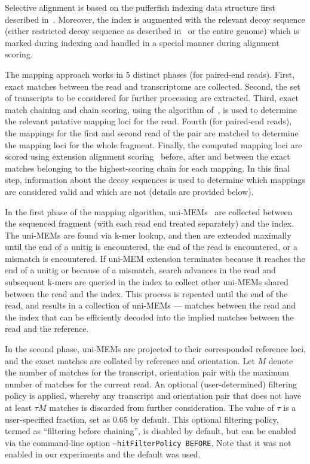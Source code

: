 Selective alignment is based on the pufferfish indexing data structure first
described in~\citep{pufferfish}. Moreover, the index is augmented with the
relevant decoy sequence (either restricted decoy sequence as described
in~ or the entire genome) which is marked during
indexing and handled in a special manner during alignment scoring.


The mapping approach works in 5 distinct phases (for paired-end reads).
First, exact matches between the read and transcriptome are collected.
Second, the set of transcripts to be considered for further processing are
extracted. Third, exact match chaining and chain scoring, using the algorithm
of~\citet{minimap2}, is used to determine the relevant putative mapping loci
for the read. Fourth (for paired-end reads), the mappings for the first and
second read of the pair are matched to determine the mapping loci for the
whole fragment. Finally, the computed mapping loci are scored using extension
alignment scoring~\citep{minimap2,suzuki2018introducing} before, after and 
between the exact matches belonging to the highest-scoring chain for each 
mapping. In this final step, information about the decoy sequences is used to
determine which mappings are considered valid and which are not (details are
provided below).

In the first phase of the mapping algorithm, uni-MEMs~\citep{debga} are
collected between the sequenced fragment (with each read end treated
separately) and the index. The uni-MEMs are found via k-mer lookup, and then
are extended maximally until the end of a unitig is encountered, the
end of the read is encountered, or a mismatch is encountered.  If uni-MEM 
extension terminates because it reaches the end of a unitig or because of a 
mismatch, search advances in the read and subsequent k-mers are queried in 
the index to collect other uni-MEMs shared between the read and the index.
This process is repeated until the end of the read, and results in a collection 
of uni-MEMs --- matches between the read and the index that can be efficiently 
decoded into the implied matches between the read and the reference.

In the second phase, uni-MEMs are projected to their corresponded reference
loci, and the exact matches are collated by reference and orientation. Let
$M$ denote the number of matches for the transcript, orientation pair with
the maximum number of matches for the current read. An optional
(user-determined) filtering policy is applied, whereby any transcript and
orientation pair that does not have at least $\tau M$ matches is
discarded from further consideration. The value of $\tau$ is a user-specified
fraction, set as $0.65$ by default.  This optional filtering policy, termed 
as ``filtering before chaining'', is disabled by default, but can be enabled 
via the command-line option \texttt{--hitFilterPolicy BEFORE}. Note that it
was not enabled in our experiments and the default was used. 

